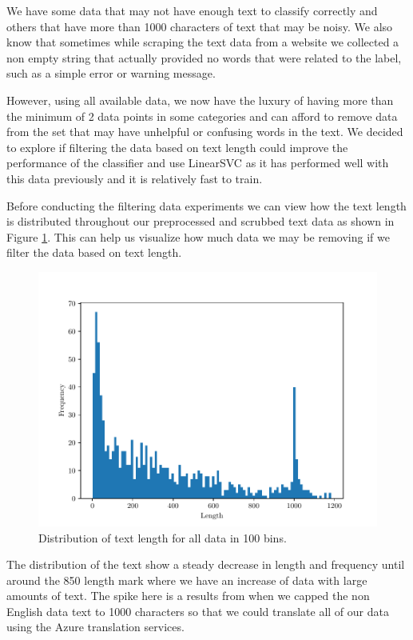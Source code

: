 We have some data that may not have enough text to classify correctly and others that have more than 1000 characters of text that may be noisy. We also know that sometimes while scraping the text data from a website we collected a non empty string that actually provided no words that were related to the label, such as a simple error or warning message.

However, using all available data, we now have the luxury of having more than the minimum of 2 data points in some categories and can afford to remove data from the set that may have unhelpful or confusing words in the text. We decided to explore if filtering the data based on text length could improve the performance of the classifier and use LinearSVC as it has performed well with this data previously and it is relatively fast to train.

Before conducting the filtering data experiments we can view how the text length is distributed throughout our preprocessed and scrubbed text data as shown in Figure \ref{fig:string_length_dist}. This can help us visualize how much data we may be removing if we filter the data based on text length.

\begin{figure}[h]
    \centering
    \includegraphics[width=\scale\textwidth]{../img/plot_string_length_dist_all_data.pdf}
    \caption{Distribution of text length for all data in 100 bins.}
    \label{fig:string_length_dist}
\end{figure}

The distribution of the text show a steady decrease in length and frequency until around the 850 length mark where we have an increase of data with large amounts of text. The spike here is a results from when we capped the non English data text to 1000 characters so that we could translate all of our data using the Azure translation services.

